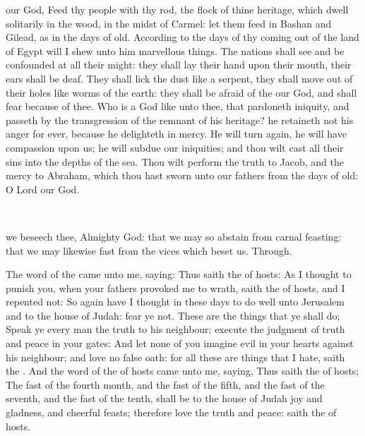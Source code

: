 our God, Feed thy people with thy rod, the flock of thine heritage, which dwell solitarily in the wood, in the midst of Carmel: let them feed in Bashan and Gilead, as in the days of old. According to the days of thy coming out of the land of Egypt will I shew unto him marvellous things. The nations shall see and be confounded at all their might: they shall lay their hand upon their mouth, their ears shall be deaf. They shall lick the dust like a serpent, they shall move out of their holes like worms of the earth: they shall be afraid of the  our God, and shall fear because of thee. Who is a God like unto thee, that pardoneth iniquity, and passeth by the transgression of the remnant of his heritage? he retaineth not his anger for ever, because he delighteth in mercy. He will turn again, he will have compassion upon us; he will subdue our iniquities; and thou wilt cast all their sins into the depths of the sea. Thou wilt perform the truth to Jacob, and the mercy to Abraham, which thou hast sworn unto our fathers from the days of old: O Lord our God.

\\


\vspace{-0.25\baselineskip}

\collect
{} we beseech thee, Almighty God: that we may so abstain from carnal feasting: that we may likewise fast from the vices which beset us. Through.

\vspace{-0.25\baselineskip}

 The word of the  came unto me, saying: Thus saith the  of hosts: As I thought to punish you, when your fathers provoked me to wrath, saith the  of hosts, and I repented not: So again have I thought in these days to do well unto Jerusalem and to the house of Judah: fear ye not. These are the things that ye shall do; Speak ye every man the truth to his neighbour; execute the judgment of truth and peace in your gates: And let none of you imagine evil in your hearts against his neighbour; and love no false oath: for all these are things that I hate, saith the . And the word of the  of hosts came unto me, saying, Thus saith the  of hosts; The fast of the fourth month, and the fast of the fifth, and the fast of the seventh, and the fast of the tenth, shall be to the house of Judah joy and gladness, and cheerful feasts; therefore love the truth and peace: saith the  of hosts.

